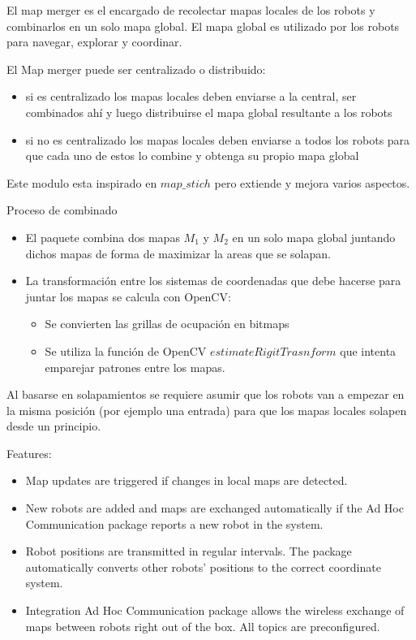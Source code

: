 El map merger es el encargado de recolectar mapas locales de los robots y combinarlos en un solo mapa global. El mapa global es utilizado por los robots para navegar, explorar y coordinar.

El Map merger puede ser centralizado o distribuido:
\begin{itemize}
\item si es centralizado los mapas locales deben enviarse a la central, ser combinados ahí y luego distribuirse el mapa global resultante a los robots
\item si no es centralizado los mapas locales deben enviarse a todos los robots para que cada uno de estos lo combine y obtenga su propio mapa global
\end{itemize}

Este modulo esta inspirado en $map\_stich$ pero extiende y mejora varios aspectos.

Proceso de combinado
\begin{itemize}
  \item El paquete combina dos mapas $M_1$ y $M_2$ en un solo mapa global juntando dichos mapas de forma de maximizar la areas que se solapan.

  \item La transformación entre los sistemas de coordenadas que debe hacerse para juntar los mapas se calcula con OpenCV:
  \begin{itemize}
    \item Se convierten las grillas de ocupación en bitmaps
    \item Se utiliza la función de OpenCV $estimateRigitTrasnform$ que intenta emparejar patrones entre los mapas.
  \end{itemize}
\end{itemize}

Al basarse en solapamientos se requiere asumir que los robots van a empezar en la misma posición (por ejemplo una entrada) para que los mapas locales solapen desde un principio.

Features:
\begin{itemize}
\item Map updates are triggered if changes in local maps are detected.
\item New robots are added and maps are exchanged automatically if the Ad Hoc Communication package reports a new robot in the system.
\item Robot positions are transmitted in regular intervals. The package automatically converts other robots’ positions to the correct coordinate system.
\item Integration Ad Hoc Communication package allows the wireless exchange of maps between robots right out of the box. All topics are preconfigured.
\end{itemize}

